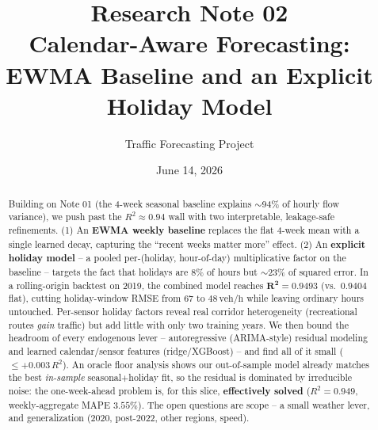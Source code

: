 \documentclass[11pt]{article}
\title{\textbf{Research Note 02}\\[2pt]
Calendar-Aware Forecasting:\\ EWMA Baseline and an Explicit Holiday Model}
\author{Traffic Forecasting Project}
\date{June 14, 2026}
\newcommand{\veh}{\,\text{veh/h}}
\begin{document}
\maketitle

\begin{abstract}
\noindent
Building on Note 01 (the 4-week seasonal baseline explains $\sim$94\% of hourly
flow variance), we push past the $R^2\approx0.94$ wall with two interpretable,
leakage-safe refinements. (1) An \textbf{EWMA weekly baseline} replaces the flat
4-week mean with a single learned decay, capturing the ``recent weeks matter
more'' effect. (2) An \textbf{explicit holiday model} -- a pooled
per-(holiday, hour-of-day) multiplicative factor on the baseline -- targets the
fact that holidays are $8\%$ of hours but $\sim$23\% of squared error. In a
rolling-origin backtest on 2019, the combined model reaches
$\mathbf{R^2=0.9493}$ (vs.\ $0.9404$ flat), cutting holiday-window RMSE from
$67$ to $48\veh$ while leaving ordinary hours untouched. Per-sensor holiday
factors reveal real corridor heterogeneity (recreational routes \emph{gain}
traffic) but add little with only two training years. We then bound the headroom
of every endogenous lever -- autoregressive (ARIMA-style) residual modeling and
learned calendar/sensor features (ridge/XGBoost) -- and find all of it small
($\le+0.003\,R^2$). An oracle floor analysis shows our out-of-sample model
already matches the best \emph{in-sample} seasonal$+$holiday fit, so the residual
is dominated by irreducible noise: the one-week-ahead problem is, for this slice,
\textbf{effectively solved} ($R^2=0.949$, weekly-aggregate MAPE $3.55\%$). The
open questions are scope -- a small weather lever, and generalization (2020,
post-2022, other regions, speed).
\end{abstract}
\end{document}
